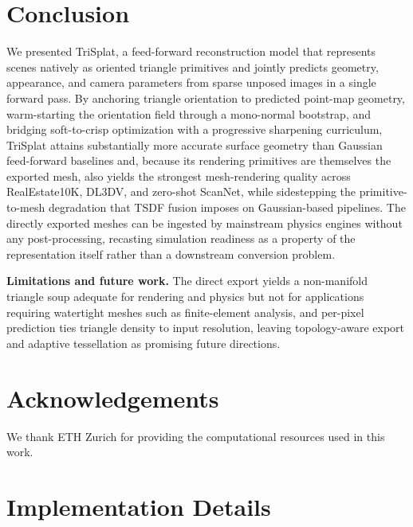 \documentclass{llmxive}
\providecommand{\method}{TriSplat\xspace}
\providecommand{\boldstart}[1]{\vspace{0.1in}\noindent\textbf{#1}}
\providecommand{\thetable}{\Alph{table}}
\providecommand{\thefigure}{\Alph{figure}}
\providecommand{\thesection}{\Alph{section}}
\begin{document}
\section{Conclusion}
\label{sec:conclusion}

We presented \method, a feed-forward reconstruction model that represents scenes natively as oriented triangle primitives and jointly predicts geometry, appearance, and camera parameters from sparse unposed images in a single forward pass. By anchoring triangle orientation to predicted point-map geometry, warm-starting the orientation field through a mono-normal bootstrap, and bridging soft-to-crisp optimization with a progressive sharpening curriculum, \method attains substantially more accurate surface geometry than Gaussian feed-forward baselines and, because its rendering primitives are themselves the exported mesh, also yields the strongest mesh-rendering quality across RealEstate10K, DL3DV, and zero-shot ScanNet, while sidestepping the primitive-to-mesh degradation that TSDF fusion imposes on Gaussian-based pipelines. The directly exported meshes can be ingested by mainstream physics engines without any post-processing, recasting simulation readiness as a property of the representation itself rather than a downstream conversion problem.

\boldstart{Limitations and future work.}
The direct export yields a non-manifold triangle soup adequate for rendering and physics but not for applications requiring watertight meshes such as finite-element analysis, and per-pixel prediction ties triangle density to input resolution, leaving topology-aware export and adaptive tessellation as promising future directions.

\section*{Acknowledgements}

We thank ETH Zurich for providing the computational resources used in this work.






\appendix

\setcounter{table}{0}
\setcounter{figure}{0}
\setcounter{section}{0}
\renewcommand{\thetable}{\Alph{table}}
\renewcommand{\thefigure}{\Alph{figure}}
\renewcommand{\thesection}{\Alph{section}}



\section{Implementation Details}
\label{sec:app_implementation}
\end{document}
